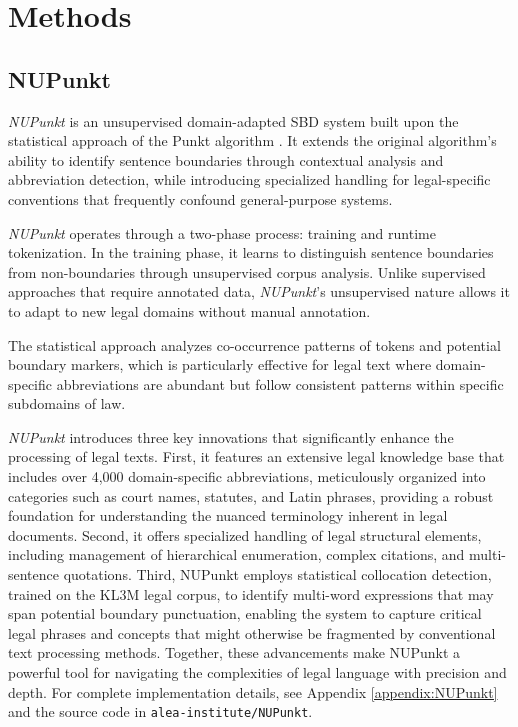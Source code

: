 \section{Methods}
 
\subsection{NUPunkt}
\textit{NUPunkt} is an unsupervised domain-adapted SBD system built upon the statistical approach of the Punkt algorithm \cite{kiss2006unsupervised}. It extends the original algorithm's ability to identify sentence boundaries through contextual analysis and abbreviation detection, while introducing specialized handling for legal-specific conventions that frequently confound general-purpose systems.

\textit{NUPunkt} operates through a two-phase process: training and runtime tokenization. In the training phase, it learns to distinguish sentence boundaries from non-boundaries through unsupervised corpus analysis. Unlike supervised approaches that require annotated data, \textit{NUPunkt}'s unsupervised nature allows it to adapt to new legal domains without manual annotation.

The statistical approach analyzes co-occurrence patterns of tokens and potential boundary markers, which is particularly effective for legal text where domain-specific abbreviations are abundant but follow consistent patterns within specific subdomains of law.

\textit{NUPunkt}  introduces three key innovations that significantly enhance the processing of legal texts.  First, it features an extensive legal knowledge base that includes over 4,000 domain-specific abbreviations, meticulously organized into categories such as court names, statutes, and Latin phrases, providing a robust foundation for understanding the nuanced terminology inherent in legal documents.  Second, it offers specialized handling of legal structural elements, including management of hierarchical enumeration, complex citations, and multi-sentence quotations.  Third, NUPunkt employs statistical collocation detection, trained on the KL3M legal corpus, to identify multi-word expressions that may span potential boundary punctuation, enabling the system to capture critical legal phrases and concepts that might otherwise be fragmented by conventional text processing methods.  Together, these advancements make NUPunkt a powerful tool for navigating the complexities of legal language with precision and depth.  For complete implementation details, see Appendix \ref{appendix:NUPunkt} and the source code in \texttt{alea-institute/NUPunkt}.

